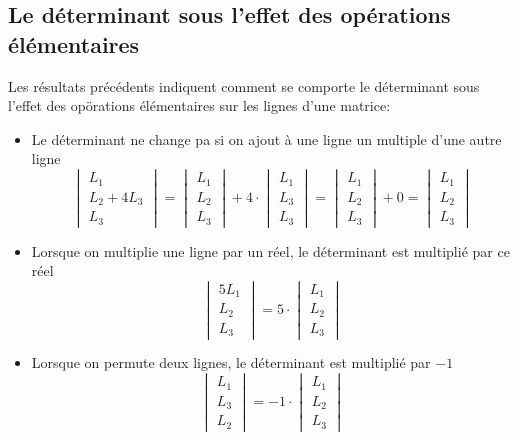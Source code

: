 \subsection{Le déterminant sous l'effet des opérations élémentaires}
%
Les résultats précédents indiquent comment se comporte le déterminant sous l'effet des opörations élémentaires sur les lignes d'une matrice:
\begin{itemize}
  \item Le déterminant ne change pa si on ajout à une ligne un multiple d'une autre ligne
    $$\begin{vmatrix} L_1 \\ L_2 + 4 L_3 \\ L_3 \end{vmatrix} 
      = \begin{vmatrix} L_1 \\ L_2 \\ L_3 \end{vmatrix} + 4 \cdot \begin{vmatrix} L_1 \\ L_3 \\ L_3 \end{vmatrix}
      = \begin{vmatrix} L_1 \\ L_2 \\ L_3 \end{vmatrix} + 0
      = \begin{vmatrix} L_1 \\ L_2 \\ L_3 \end{vmatrix}$$
      
  \item Lorsque on multiplie une ligne par un réel, le déterminant est multiplié par ce réel
    $$\begin{vmatrix} 5 L_1 \\ L_2 \\ L_3 \end{vmatrix} = 5 \cdot \begin{vmatrix} L_1 \\ L_2 \\ L_3 \end{vmatrix}$$
    
  \item Lorsque on permute deux lignes, le déterminant est multiplié par $-1$
    $$\begin{vmatrix} L_1 \\ L_3 \\ L_2 \end{vmatrix} = -1 \cdot \begin{vmatrix} L_1 \\ L_2 \\ L_3 \end{vmatrix}$$
\end{itemize}

